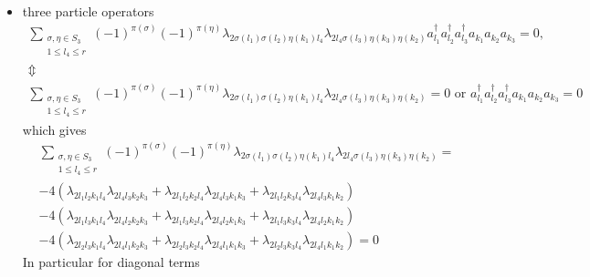 \documentclass[aps,preprint]{revtex4}%
\begin{document}
\begin{itemize}
\item three particle operators
\begin{gather}
\sum_{\substack{\sigma,\eta\in S_{3}\\1\leq l_{4}\leq r}}\left(  -1\right)
^{\pi\left(  \sigma\right)  }\left(  -1\right)  ^{\pi\left(  \eta\right)
}\lambda_{2\sigma\left(  l_{1}\right)  \sigma\left(  l_{2}\right)  \eta\left(
k_{1}\right)  l_{4}}\lambda_{2l_{4}\sigma\left(  l_{3}\right)  \eta\left(
k_{3}\right)  \eta\left(  k_{2}\right)  }a_{l_{1}}^{\dagger}a_{l_{2}}%
^{\dagger}a_{l_{3}}^{\dagger}a_{k_{1}}a_{k_{2}}a_{k_{3}}=0,\nonumber\\
\Updownarrow\nonumber\\
\sum_{\substack{\sigma,\eta\in S_{3}\\1\leq l_{4}\leq r}}\left(  -1\right)
^{\pi\left(  \sigma\right)  }\left(  -1\right)  ^{\pi\left(  \eta\right)
}\lambda_{2\sigma\left(  l_{1}\right)  \sigma\left(  l_{2}\right)  \eta\left(
k_{1}\right)  l_{4}}\lambda_{2l_{4}\sigma\left(  l_{3}\right)  \eta\left(
k_{3}\right)  \eta\left(  k_{2}\right)  }=0\text{ or }a_{l_{1}}^{\dagger
}a_{l_{2}}^{\dagger}a_{l_{3}}^{\dagger}a_{k_{1}}a_{k_{2}}a_{k_{3}}=0
\end{gather}
which gives%
\begin{align}
&  \sum_{\substack{\sigma,\eta\in S_{3}\\1\leq l_{4}\leq r}}\left(  -1\right)
^{\pi\left(  \sigma\right)  }\left(  -1\right)  ^{\pi\left(  \eta\right)
}\lambda_{2\sigma\left(  l_{1}\right)  \sigma\left(  l_{2}\right)  \eta\left(
k_{1}\right)  l_{4}}\lambda_{2l_{4}\sigma\left(  l_{3}\right)  \eta\left(
k_{3}\right)  \eta\left(  k_{2}\right)  }\left.  =\right. \nonumber\\
&  -4\left(  \lambda_{2l_{1}l_{2}k_{1}l_{4}}\lambda_{2l_{4}l_{3}k_{2}k_{3}%
}+\lambda_{2l_{1}l_{2}k_{2}l_{4}}\lambda_{2l_{4}l_{3}k_{1}k_{3}}%
+\lambda_{2l_{1}l_{2}k_{3}l_{4}}\lambda_{2l_{4}l_{3}k_{1}k_{2}}\right)
\nonumber\\
&  -4\left(  \lambda_{2l_{1}l_{3}k_{1}l_{4}}\lambda_{2l_{4}l_{2}k_{2}k_{3}%
}+\lambda_{2l_{1}l_{3}k_{2}l_{4}}\lambda_{2l_{4}l_{2}k_{1}k_{3}}%
+\lambda_{2l_{1}l_{3}k_{3}l_{4}}\lambda_{2l_{4}l_{2}k_{1}k_{2}}\right)
\nonumber\\
&  -4\left(  \lambda_{2l_{2}l_{3}k_{1}l_{4}}\lambda_{2l_{4}l_{1}k_{2}k_{3}%
}+\lambda_{2l_{2}l_{3}k_{2}l_{4}}\lambda_{2l_{4}l_{1}k_{1}k_{3}}%
+\lambda_{2l_{2}l_{3}k_{3}l_{4}}\lambda_{2l_{4}l_{1}k_{1}k_{2}}\right)
\left.  =\right.  0
\end{align}
In particular for diagonal terms

\end{itemize}
\end{document}
